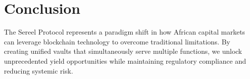 \documentclass[12pt]{article}
\begin{document}
\section{Conclusion}

The Sereel Protocol represents a paradigm shift in how African capital markets can leverage blockchain technology to overcome traditional limitations. By creating unified vaults that simultaneously serve multiple functions, we unlock unprecedented yield opportunities while maintaining regulatory compliance and reducing systemic risk.
\end{document}
